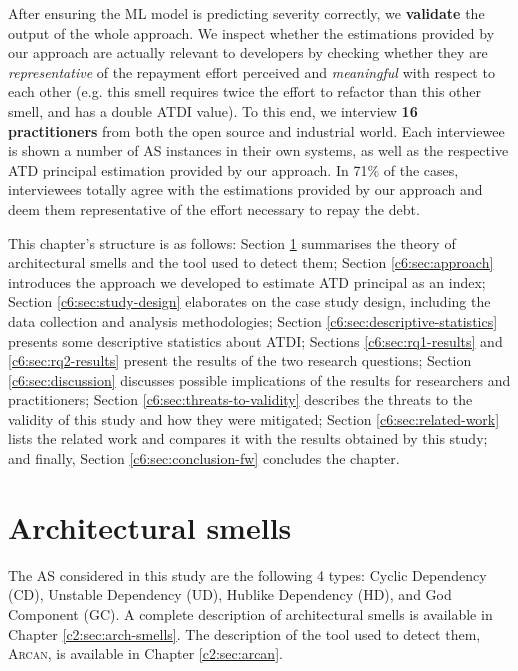 After ensuring the ML model is predicting severity correctly, we \textbf{validate} the output of the whole approach. 
We inspect whether the estimations provided by our approach are actually relevant to developers by checking whether they are \emph{representative} of the repayment effort perceived and \emph{meaningful} with respect to each other (e.g. this smell requires twice the effort to refactor than this other smell, and has a double ATDI value).
To this end, we interview \textbf{16 practitioners} from both the open source and industrial world.
Each interviewee is shown a number of AS instances in their own systems, as well as the respective ATD principal estimation provided by our approach.
In 71\% of the cases, interviewees totally agree with the estimations provided by our approach and deem them representative of the effort necessary to repay the debt.

This chapter's structure is as follows:
Section \ref{c6:sec:AS} summarises the theory of architectural smells and the tool used to detect them; Section \ref{c6:sec:approach} introduces the approach we developed to estimate ATD principal as an index; Section \ref{c6:sec:study-design} elaborates on the case study design, including the data collection and analysis methodologies; Section \ref{c6:sec:descriptive-statistics} presents some descriptive statistics about ATDI; Sections \ref{c6:sec:rq1-results} and \ref{c6:sec:rq2-results}  present the results of the two research questions; Section \ref{c6:sec:discussion} discusses possible implications of the results for researchers and practitioners; Section \ref{c6:sec:threats-to-validity} describes the threats to the validity of this study and how they were mitigated; Section \ref{c6:sec:related-work} lists the related work and compares it with the results obtained by this study; and finally, Section \ref{c6:sec:conclusion-fw} concludes the chapter.


\section{Architectural smells}\label{c6:sec:AS}
The AS considered in this study are the following 4 types: Cyclic Dependency (CD), Unstable Dependency (UD), Hublike Dependency (HD), and God Component (GC).
A complete description of architectural smells is available in Chapter \ref{c2:sec:arch-smells}.
The description of the tool used to detect them, \textsc{Arcan}, is available in Chapter \ref{c2:sec:arcan}.


